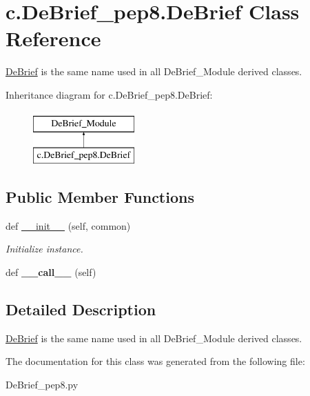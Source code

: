 \hypertarget{classc_1_1_de_brief__pep8_1_1_de_brief}{}\section{c.\+De\+Brief\+\_\+pep8.\+De\+Brief Class Reference}
\label{classc_1_1_de_brief__pep8_1_1_de_brief}


\hyperlink{classc_1_1_de_brief__pep8_1_1_de_brief}{De\+Brief} is the same name used in all De\+Brief\+\_\+\+Module derived classes.  


Inheritance diagram for c.\+De\+Brief\+\_\+pep8.\+De\+Brief\+:\begin{figure}[H]
\begin{center}
\leavevmode
\includegraphics[height=2.000000cm]{classc_1_1_de_brief__pep8_1_1_de_brief}
\end{center}
\end{figure}
\subsection*{Public Member Functions}
\begin{DoxyCompactItemize}
\item 
\hypertarget{classc_1_1_de_brief__pep8_1_1_de_brief_af199e2e84ffa0af29a1d6518262f2438}{}def \hyperlink{classc_1_1_de_brief__pep8_1_1_de_brief_af199e2e84ffa0af29a1d6518262f2438}{\+\_\+\+\_\+init\+\_\+\+\_\+} (self, common)\label{classc_1_1_de_brief__pep8_1_1_de_brief_af199e2e84ffa0af29a1d6518262f2438}

\begin{DoxyCompactList}\small\item\em Initialize instance. \end{DoxyCompactList}\item 
\hypertarget{classc_1_1_de_brief__pep8_1_1_de_brief_a0540e8b1be9cdac5a672312946e369cf}{}def {\bfseries \+\_\+\+\_\+call\+\_\+\+\_\+} (self)\label{classc_1_1_de_brief__pep8_1_1_de_brief_a0540e8b1be9cdac5a672312946e369cf}

\end{DoxyCompactItemize}


\subsection{Detailed Description}
\hyperlink{classc_1_1_de_brief__pep8_1_1_de_brief}{De\+Brief} is the same name used in all De\+Brief\+\_\+\+Module derived classes. 



The documentation for this class was generated from the following file\+:\begin{DoxyCompactItemize}
\item 
De\+Brief\+\_\+pep8.\+py\end{DoxyCompactItemize}
